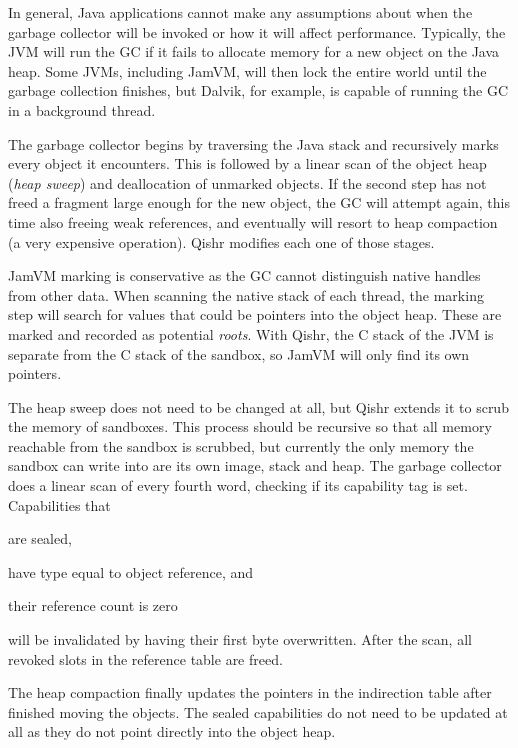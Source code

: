 \documentclass[a4paper,12pt,twoside,openright]{report}
\begin{document}
In general, Java applications cannot make any assumptions about when the garbage collector will be invoked or how it will affect performance. Typically, the JVM will run the GC if it fails to allocate memory for a new object on the Java heap. Some JVMs, including JamVM, will then lock the entire world until the garbage collection finishes, but Dalvik, for example, is capable of running the GC in a background thread. 

The garbage collector begins by traversing the Java stack and recursively marks every object it encounters. This is followed by a linear scan of the object heap (\emph{heap sweep}) and deallocation of unmarked objects. If the second step has not freed a fragment large enough for the new object, the GC will attempt again, this time also freeing weak references, and eventually will resort to heap compaction (a very expensive operation). Qishr modifies each one of those stages.

JamVM marking is conservative as the GC cannot distinguish native handles from other data. When scanning the native stack of each thread, the marking step will search for values that could be pointers into the object heap. These are marked and recorded as potential \emph{roots}. With Qishr, the C stack of the JVM is separate from the C stack of the sandbox, so JamVM will only find its own pointers.

The heap sweep does not need to be changed at all, but Qishr extends it to scrub the memory of sandboxes. This process should be recursive so that all memory reachable from the sandbox is scrubbed, but currently the only memory the sandbox can write into are its own image, stack and heap. The garbage collector does a linear scan of every fourth word, checking if its capability tag is set. Capabilities that 
\begin{inparaenum}
\item are sealed,
\item have type equal to object reference, and
\item their reference count is zero
\end{inparaenum}
will be invalidated by having their first byte overwritten. After the scan, all revoked slots in the reference table are freed.

The heap compaction finally updates the pointers in the indirection table after finished moving the objects. The sealed capabilities do not need to be updated at all as they do not point directly into the object heap.
\end{document}
